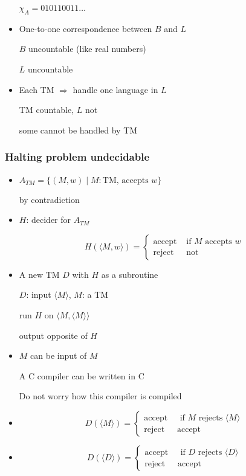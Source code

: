 \begin{frame}[allowframebreaks]
\begin{itemize}
$\chi_A= 0 1 0 11 00 11 \ldots$
\item One-to-one correspondence between $B$ and $L$

$B$ uncountable (like real numbers)

$L$ uncountable
\item Each TM $\Rightarrow$ handle one language in $L$

TM countable, $L$ not

some cannot be handled by TM
\end{itemize}\end{frame} \begin{frame}[allowframebreaks] \frametitle{Halting problem undecidable}
  \begin{itemize}
\item 
$A_{TM}
=\{(M,w)\mid M: \mbox{TM, accepts } w\}$

by contradiction
\item $H$: decider for $A_{TM}$

  \begin{equation*}
    H(\langle  M,w\rangle )=
    \begin{cases}
      \mbox{accept} & \mbox{ if } M \mbox{ accepts } w\\
\mbox{reject} & \mbox{ not}
    \end{cases}
  \end{equation*}
\item A new TM $D$ with $H$ as a subroutine

$D$: input $\langle  M\rangle $, $M$: a TM

run $H$ on $\langle  M,\langle  M\rangle \rangle $

output opposite of $H$

\item $M$ can be input of $M$

A C compiler can be written in C

Do not worry how this compiler is compiled


\item 
  \begin{equation*}
    D(\langle  M\rangle )
=
\begin{cases}
  \mbox{accept } & 
\mbox{ if } M \mbox{ rejects } \langle  M\rangle \\
\mbox{reject} & \mbox{accept}
\end{cases}
  \end{equation*}

\item 
  \begin{equation*}
    D(\langle  D\rangle )
=
\begin{cases}
  \mbox{accept } & 
\mbox{ if } D \mbox{ rejects } \langle  D\rangle \\
\mbox{reject} & \mbox{accept}
\end{cases}
  \end{equation*}


\end{itemize}
\end{frame}
